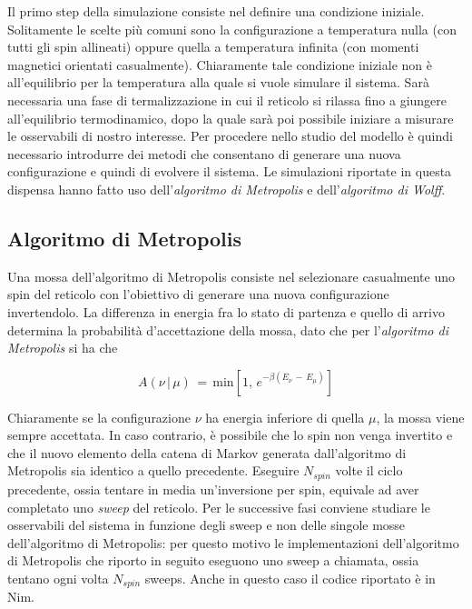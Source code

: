Il primo step della simulazione consiste nel definire una condizione iniziale. Solitamente le scelte più comuni sono la configurazione 
a temperatura nulla (con tutti gli spin allineati) oppure quella a temperatura infinita (con momenti magnetici orientati casualmente). 
Chiaramente tale condizione iniziale non è all'equilibrio per la temperatura alla quale si vuole simulare il sistema. Sarà necessaria 
una fase di termalizzazione in cui il reticolo si rilassa fino a giungere all'equilibrio termodinamico, dopo la quale sarà poi possibile 
iniziare a misurare le osservabili di nostro interesse. Per procedere nello studio del modello è quindi necessario introdurre dei metodi 
che consentano di generare una nuova configurazione e quindi di evolvere il sistema. Le simulazioni riportate in questa dispensa 
hanno fatto uso dell'\textit{algoritmo di Metropolis} e dell'\textit{algoritmo di Wolff}.





\subsection{Algoritmo di Metropolis}

Una mossa dell'algoritmo di Metropolis consiste nel selezionare casualmente uno spin del reticolo con l'obiettivo di generare una 
nuova configurazione invertendolo. La differenza in energia fra lo stato di partenza e quello di arrivo determina 
la probabilità d'accettazione della mossa, dato che per l'\textit{algoritmo di Metropolis} \cite{M(RT)2} si ha che 

\begin{equation}
    A\left(\nu\,|\,\mu\right)\,=\,\text{min}\left[1,\,e^{-\beta\left(E_{\nu}\,-\,E_{\mu}\right)}\right]
    \label{eq: Metropolis_1D}
\end{equation}

Chiaramente se la configurazione $\nu$ ha energia inferiore di quella $\mu$, la mossa viene sempre accettata. In caso contrario, è 
possibile che lo spin non venga invertito e che il nuovo elemento della catena di Markov generata dall'algoritmo di Metropolis sia identico 
a quello precedente. Eseguire $N_{spin}$ volte il ciclo precedente, ossia tentare in media un'inversione per spin, equivale ad aver 
completato uno \textit{sweep} del reticolo. Per le successive fasi conviene studiare le osservabili del sistema in funzione degli sweep e 
non delle singole mosse dell'algoritmo di Metropolis: per questo motivo le implementazioni dell'algoritmo di Metropolis che riporto in seguito 
eseguono uno sweep a chiamata, ossia tentano ogni volta $N_{spin}$ sweeps. Anche in questo caso il codice riportato è in Nim.



